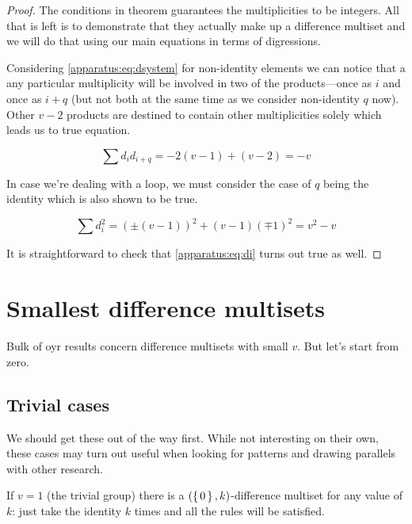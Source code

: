 \documentclass{article}
\theoremstyle{plain}
\theoremstyle{definition}
\theoremstyle{remark}
\begin{document}
            \begin{proof}
                The conditions in theorem guarantees the multiplicities to be integers. All that is left is to demonstrate that they actually make up a difference multiset and we will do that using our main equations in terms of digressions.
                
                Considering \eqref{apparatus:eq:dsystem} for non-identity elements we can notice that a any particular multiplicity will be involved in two of the products---once as $i$ and once as $i+q$ (but not both at the same time as we consider non-identity $q$ now). Other $v-2$ products are destined to contain other multiplicities solely which leads us to true equation.
                
                \begin{equation}
                    \sum d_i d_{i+q} = -2(v-1) + (v-2) = -v
                \end{equation}

                In case we're dealing with a loop, we must consider the case of $q$ being the identity which is also shown to be true.
                
                \begin{equation}
                    \sum d_i^2  = \left( \pm (v-1) \right)^2 + (v-1) \left( \mp 1 \right)^2 = v^2 - v
                \end{equation}
            
                It is straightforward to check that \eqref{apparatus:eq:di} turns out true as well.
            \end{proof}
            
	\section{Smallest difference multisets}
        Bulk of oyr results concern difference multisets with small $v$. But let's start from zero.
	
		\subsection{Trivial cases}
			We should get these out of the way first. While not interesting on their own, these cases may turn out useful when looking for patterns and drawing parallels with other research.
			
			If $v=1$ (the trivial group) there is a $(\set{0},k)$-difference multiset for any value of $k$: just take the identity $k$ times and all the rules will be satisfied.
			
\end{document}
